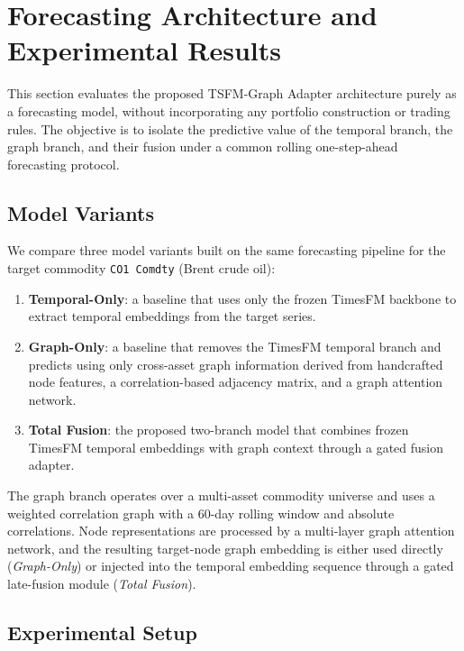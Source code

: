 \section{Forecasting Architecture and Experimental Results}
\label{sec:forecast-results}

This section evaluates the proposed TSFM-Graph Adapter architecture purely as a
forecasting model, without incorporating any portfolio construction or trading
rules. The objective is to isolate the predictive value of the temporal branch,
the graph branch, and their fusion under a common rolling one-step-ahead
forecasting protocol.

\subsection{Model Variants}

We compare three model variants built on the same forecasting pipeline for the
target commodity \texttt{CO1 Comdty} (Brent crude oil):

\begin{enumerate}
    \item \textbf{Temporal-Only}: a baseline that uses only the frozen TimesFM
    backbone to extract temporal embeddings from the target series.
    \item \textbf{Graph-Only}: a baseline that removes the TimesFM temporal
    branch and predicts using only cross-asset graph information derived from
    handcrafted node features, a correlation-based adjacency matrix, and a graph
    attention network.
    \item \textbf{Total Fusion}: the proposed two-branch model that combines
    frozen TimesFM temporal embeddings with graph context through a gated fusion
    adapter.
\end{enumerate}

The graph branch operates over a multi-asset commodity universe and uses a
weighted correlation graph with a 60-day rolling window and absolute
correlations. Node representations are processed by a multi-layer graph
attention network, and the resulting target-node graph embedding is either used
directly (\emph{Graph-Only}) or injected into the temporal embedding sequence
through a gated late-fusion module (\emph{Total Fusion}).

\subsection{Experimental Setup}

